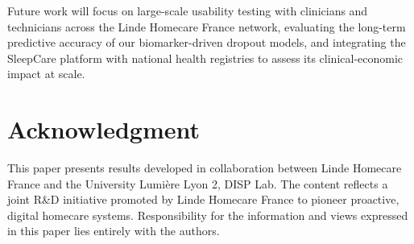 \documentclass[conference]{IEEEtran}
\begin{document}
Future work will focus on large-scale usability testing with clinicians and technicians across the Linde Homecare France network, evaluating the long-term predictive accuracy of our biomarker-driven dropout models, and integrating the SleepCare platform with national health registries to assess its clinical-economic impact at scale.

\section*{Acknowledgment}

This paper presents results developed in collaboration between Linde Homecare France and the University Lumi\`{e}re Lyon 2, DISP Lab. The content reflects a joint R\&D initiative promoted by Linde Homecare France to pioneer proactive, digital homecare systems. Responsibility for the information and views expressed in this paper lies entirely with the authors.
\end{document}
